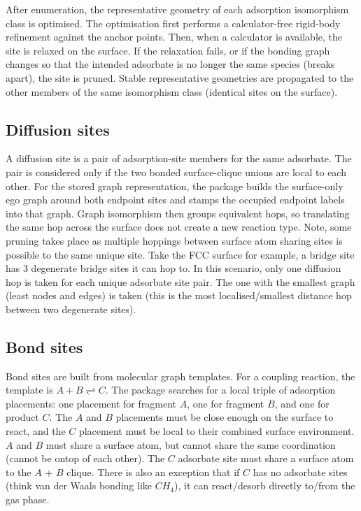 After enumeration, the representative geometry of each adsorption isomorphism class is optimised.
The optimisation first performs a calculator-free rigid-body refinement against the anchor points.
Then, when a calculator is available, the site is relaxed on the surface.
If the relaxation fails, or if the bonding graph changes so that the intended adsorbate is no longer the same species (breaks apart), the site is pruned.
Stable representative geometries are propagated to the other members of the same isomorphism class (identical sites on the surface).

\subsection{Diffusion sites}
\noindent
A diffusion site is a pair of adsorption-site members for the same adsorbate.
The pair is considered only if the two bonded surface-clique unions are local to each other.
For the stored graph representation, the package builds the surface-only ego graph around both endpoint sites and stamps the occupied endpoint labels into that graph.
Graph isomorphism then groups equivalent hops, so translating the same hop across the surface does not create a new reaction type.
Note, some pruning takes place as multiple hoppings between surface atom sharing sites is possible to the same unique site.
Take the FCC surface for example, a bridge site has 3 degenerate bridge sites it can hop to.
In this scenario, only one diffusion hop is taken for each unique adsorbate site pair.
The one with the smallest graph (least nodes and edges) is taken (this is the most localised/smallest distance hop between two degenerate sites).

\subsection{Bond sites}
\noindent
Bond sites are built from molecular graph templates.
For a coupling reaction, the template is $A + B \rightleftharpoons C$.
The package searches for a local triple of adsorption placements: one placement for fragment $A$, one for fragment $B$, and one for product $C$.
The $A$ and $B$ placements must be close enough on the surface to react, and the $C$ placement must be local to their combined surface environment.
$A$ and $B$ must share a surface atom, but cannot share the same coordination (cannot be ontop of each other).
The $C$ adsorbate site must share a surface atom to the $A$ + $B$ clique.
There is also an exception that if $C$ has no adsorbate sites (think van der Waals bonding like $CH_{4}$), it can react/desorb directly to/from the gas phase.

